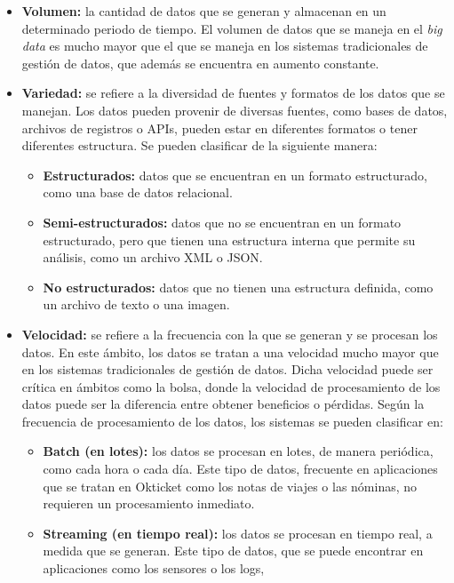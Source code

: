 \begin{itemize}
	\item \textbf{Volumen:} la cantidad de datos que se generan y almacenan en
		un determinado periodo de tiempo. El volumen de datos que se maneja en
		el \textit{big data} es mucho mayor que el que se maneja en los sistemas
		tradicionales de gestión de datos, que además se encuentra en aumento
		constante.
	\item \textbf{Variedad:} se refiere a la diversidad de fuentes y formatos de
		los datos que se manejan. Los datos pueden provenir de diversas fuentes,
		como bases de datos, archivos de registros o APIs, pueden estar en
		diferentes formatos o tener diferentes estructura. Se pueden clasificar
		de la siguiente manera: \begin{itemize}
			\item \textbf{Estructurados:} datos que se encuentran en un formato
				estructurado, como una base de datos relacional.
			\item \textbf{Semi-estructurados:} datos que no se encuentran en un
				formato estructurado, pero que tienen una estructura interna
				que permite su análisis, como un archivo XML o JSON.
			\item \textbf{No estructurados:} datos que no tienen una estructura
				definida, como un archivo de texto o una imagen.
		\end{itemize}
	\item \textbf{Velocidad:} se refiere a la frecuencia con la que se generan y
		se procesan los datos. En este ámbito, los datos se tratan a una
		velocidad mucho mayor que en los sistemas tradicionales de gestión de
		datos. Dicha velocidad puede ser crítica en ámbitos como la bolsa,
		donde la velocidad de procesamiento de los datos puede ser la
		diferencia entre obtener beneficios o pérdidas. Según la frecuencia de
		procesamiento de los datos, los sistemas se pueden clasificar en:
		\begin{itemize}
			\item \textbf{Batch (en lotes):} los datos se procesan en lotes, de
				manera periódica, como cada hora o cada día. Este tipo de datos,
				frecuente en aplicaciones que se tratan en Okticket como los
				notas de viajes o las nóminas, no requieren un procesamiento
				inmediato.
			\item \textbf{Streaming (en tiempo real):} los datos se procesan en
				tiempo real, a medida que se generan. Este tipo de datos, que se
				puede encontrar en aplicaciones como los sensores o los logs,

\end{itemize}
\end{itemize}
